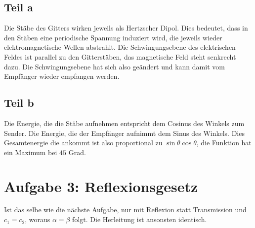 \documentclass[a4paper,german,12pt,smallheadings]{scrartcl}
\begin{document}
\subsection*{Teil a}
Die Stäbe des Gitters wirken jeweils als Hertzscher Dipol. Dies bedeutet, dass
in den Stäben eine periodische Spannung induziert wird, die jeweils wieder
elektromagnetische Wellen abstrahlt. Die Schwingungsebene des elektrischen
Feldes ist parallel zu den Gitterstäben, das magnetische Feld steht senkrecht
dazu. Die Schwingungsebene hat sich also geändert und kann damit vom Empfänger
wieder empfangen werden.

\subsection*{Teil b}
Die Energie, die die Stäbe aufnehmen entspricht dem Cosinus des Winkels zum
Sender. Die Energie, die der Empfänger aufnimmt dem Sinus des Winkels. Dies
Gesamtenergie die ankommt ist also proportional zu $\sin\theta \cos \theta$,
die Funktion hat ein Maximum bei $45$ Grad.

\section*{Aufgabe 3: Reflexionsgesetz}
Ist das selbe wie die nächste Aufgabe, nur mit Reflexion statt Transmission und
$c_1 = c_2$, woraus $\alpha = \beta$ folgt. Die Herleitung ist ansonsten
identisch.
\end{document}
